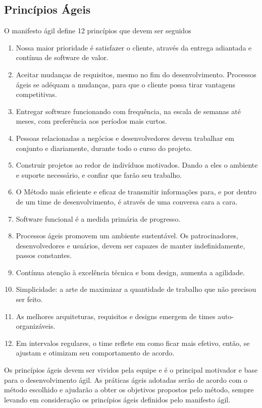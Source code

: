 \subsection{Princípios Ágeis}
\label{principios-ageis}
O manifesto ágil define 12 princípios que devem ser seguidos~\cite{manifesto2001}
%
\begin{enumerate}
\item Nossa maior prioridade é satisfazer o cliente, através da entrega adiantada e contínua de software de valor.
\item Aceitar mudanças de requisitos, mesmo no fim do desenvolvimento. Processos ágeis se adéquam a mudanças, para que o cliente possa tirar vantagens competitivas.
\item Entregar software funcionando com frequência, na escala de semanas até meses, com preferência aos períodos mais curtos.
\item Pessoas relacionadas a negócios e desenvolvedores devem trabalhar em conjunto e diariamente, durante todo o curso do projeto.
\item Construir projetos ao redor de indivíduos motivados. Dando a eles o ambiente e suporte necessário, e confiar que farão seu trabalho.
\item O Método mais eficiente e eficaz de transmitir informações para, e por dentro de um time de desenvolvimento, é através de uma conversa cara a cara.
\item Software funcional é a medida primária de progresso.
\item Processos ágeis promovem um ambiente sustentável. Os patrocinadores, desenvolvedores e usuários, devem ser capazes de manter indefinidamente, passos constantes.
\item Contínua atenção à excelência técnica e bom design, aumenta a agilidade.
\item Simplicidade: a arte de maximizar a quantidade de trabalho que não precisou ser feito.
\item As melhores arquiteturas, requisitos e designs emergem de times auto-organizáveis.
\item Em intervalos regulares, o time reflete em como ficar mais efetivo, então, se ajustam e otimizam seu comportamento de acordo.
\end{enumerate}

Os princípios ágeis devem ser vividos pela equipe e é o principal motivador e base para o desenvolvimento ágil. As práticas ágeis adotadas serão de acordo com o método escolhido e ajudarão a obter os objetivos propostos pelo método, sempre levando em consideração os princípios ágeis definidos pelo manifesto ágil.